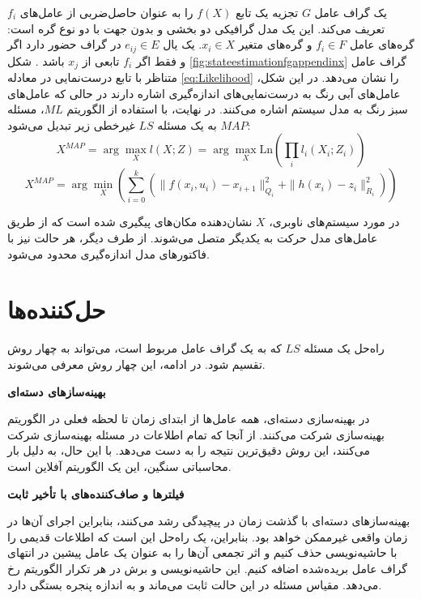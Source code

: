 یک گراف عامل \(G\) تجزیه یک تابع \(f(X)\) را به عنوان حاصل‌ضربی از عامل‌های \(f_i\) تعریف می‌کند. این یک مدل گرافیکی دو بخشی و بدون جهت با دو نوع گره است: گره‌های عامل \(f_i \in F\) و گره‌های متغیر \(x_i \in X\). یک یال \(e_{ij} \in E\) در گراف حضور دارد اگر و فقط اگر \(f_i\) تابعی از \(x_j\) باشد
\cite{kaess2012concurrent}. 
شکل
\ref{fig:stateestimationfgappendinx}
گراف عامل متناظر با تابع درست‌نمایی در معادله
\ref{eq:Likelihood}
را نشان می‌دهد. در این شکل، عامل‌های آبی رنگ به درست‌نمایی‌های اندازه‌گیری اشاره دارند در حالی که عامل‌های سبز رنگ به مدل سیستم اشاره می‌کنند.
در نهایت، با استفاده از الگوریتم $ML$، مسئله $MAP$ به یک مسئله $LS$ غیرخطی زیر تبدیل می‌شود:
\begin{equation}
	X^{MAP} = \arg\max_X l(X; Z) = \arg\max_X \text{Ln}\left(\prod_i l_i (X_i; Z_i)\right)
\end{equation}
\begin{equation}
    X^{MAP}	= \arg\min_X \left(\sum_{i=0}^k \left(\|f(x_i, u_i) - x_{i+1}\|_{Q_i}^2 + \|h(x_i) - z_i\|_{R_i}^2\right)\right)
\end{equation}

در مورد سیستم‌های ناوبری، \(X\) نشان‌دهنده مکان‌های پیگیری شده است که از طریق عامل‌های مدل حرکت به یکدیگر متصل می‌شوند. از طرف دیگر، هر حالت نیز با فاکتورهای مدل اندازه‌گیری محدود می‌شود.

\section{حل‌کننده‌ها}

راه‌حل یک مسئله $LS$ که به یک گراف عامل مربوط است، می‌تواند به چهار روش تقسیم شود. در ادامه، این چهار روش معرفی می‌شوند.

\textbf{بهینه‌سازهای دسته‌ای}

در بهینه‌سازی دسته‌ای، همه عامل‌ها از ابتدای زمان تا لحظه فعلی در الگوریتم بهینه‌سازی شرکت می‌کنند. از آنجا که تمام اطلاعات در مسئله بهینه‌سازی شرکت می‌کنند، این روش دقیق‌ترین نتیجه را به دست می‌دهد. با این حال، به دلیل بار محاسباتی سنگین، این یک الگوریتم آفلاین است.

\textbf{فیلترها و صاف‌کننده‌های با تأخیر ثابت}

بهینه‌سازهای دسته‌ای با گذشت زمان در پیچیدگی رشد می‌کنند، بنابراین اجرای آن‌ها در زمان واقعی غیرممکن خواهد بود. بنابراین، یک راه‌حل این است که اطلاعات قدیمی را با حاشیه‌نویسی حذف کنیم و اثر تجمعی آن‌ها را به عنوان یک عامل پیشین در انتهای گراف عامل بریده‌شده اضافه کنیم. این حاشیه‌نویسی و برش در هر تکرار الگوریتم رخ می‌دهد. مقیاس مسئله در این حالت ثابت می‌ماند و به اندازه پنجره بستگی دارد.

